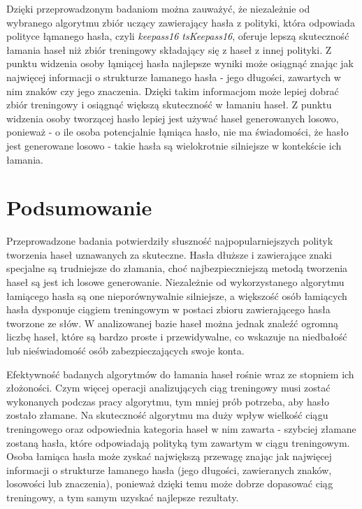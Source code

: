 \documentclass{article}
\begin{document}
	Dzięki przeprowadzonym badaniom można zauważyć, że niezależnie od wybranego algorytmu zbiór uczący zawierający hasła z polityki,
	która odpowiada polityce łąmanego hasła, czyli \textit{keepass16 tsKeepass16}, oferuje lepszą skuteczność łamania haseł
	niż zbiór treningowy składający się z haseł z innej polityki. Z punktu widzenia osoby łąmiącej hasła najlepsze wyniki może osiągnąć
	znając jak najwięcej informacji o strukturze łamanego hasła - jego długości, zawartych w nim znaków czy jego znaczenia. Dzięki takim informacjom
	może lepiej dobrać zbiór treningowy i osiągnąć większą skuteczność w łamaniu haseł. Z punktu widzenia osoby tworzącej hasło
	lepiej jest używać haseł generowanych losowo, ponieważ - o ile osoba potencjalnie łąmiąca hasło, nie ma świadomości, że hasło jest
	generowane losowo - takie hasła są wielokrotnie silniejsze w kontekście ich łamania.


	\section{Podsumowanie}
	Przeprowadzone badania potwierdziły słuszność najpopularniejszych polityk tworzenia haseł uznawanych za skuteczne. Hasła dłuższe i
	zawierające znaki specjalne są trudniejsze do złamania, choć najbezpieczniejszą metodą tworzenia haseł są jest ich losowe generowanie.
	Niezależnie od wykorzystanego algorytmu łamiącego hasła są one nieporównywalnie silniejsze, a większość osób łamiących hasła dysponuje
	ciągiem treningowym w postaci zbioru zawierającego hasła tworzone ze słów. W analizowanej bazie haseł można jednak znaleźć ogromną
	liczbę haseł, które są bardzo proste i przewidywalne, co wskazuje na niedbałość lub nieświadomość osób zabezpieczających swoje konta.

	Efektywność badanych algorytmów do łamania haseł rośnie wraz ze stopniem ich złożoności. Czym więcej operacji analizujących ciąg treningowy
	musi zostać wykonanych podczas pracy algorytmu, tym mniej prób potrzeba, aby hasło zostało złamane. Na skuteczność algorytmu ma duży wpływ
	wielkość ciągu treningowego oraz odpowiednia kategoria haseł w nim zawarta - szybciej złamane zostaną hasła, które odpowiadają polityką
	tym zawartym w ciągu treningowym. Osoba łamiąca hasła może zyskać największą przewagę znając jak najwięcej informacji o strukturze
	łamanego hasła (jego długości, zawieranych znaków, losowości lub znaczenia), ponieważ dzięki temu może dobrze dopasować ciąg treningowy,
	a tym samym uzyskać najlepsze rezultaty.

	\newpage
	
	
\end{document}
